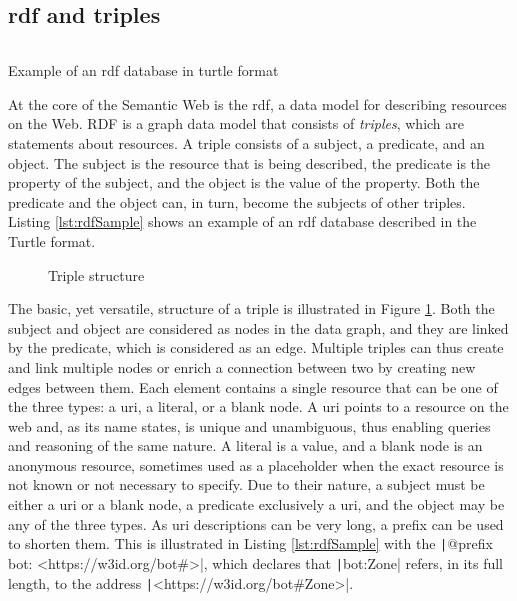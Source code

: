 \subsection{\acs{rdf} and triples}

\begin{listing}[h]
	\inputminted{turtle}{figures/snippets/rdfSample.ttl}
	\vspace{-0.7cm}
	\caption{Example of an \ac{rdf} database in turtle format}
	\label{lst:rdfSample}
\end{listing}

At the core of the Semantic Web is the \ac{rdf}, a data model for describing resources on the Web. RDF is a graph data model that consists of \emph{triples}, which are statements about resources. A triple consists of a subject, a predicate, and an object. The subject is the resource that is being described, the predicate is the property of the subject, and the object is the value of the property. Both the predicate and the object can, in turn, become the subjects of other triples. Listing \ref{lst:rdfSample} shows an example of an \ac{rdf} database described in the Turtle format.


\begin{figure}[h]
	\centering
	
	\caption{Triple structure}
	\label{fig:triple}
\end{figure}

The basic, yet versatile, structure of a triple is illustrated in Figure \ref{fig:triple}. Both the subject and object are considered as nodes in the data graph, and they are linked by the predicate, which is considered as an edge. Multiple triples can thus create and link multiple nodes or enrich a connection between two by creating new edges between them. Each element contains a single resource that can be one of the three types: a \acs{uri}, a literal, or a blank node. A \ac{uri} points to a resource on the web and, as its name states, is unique and unambiguous, thus enabling queries and reasoning of the same nature. A literal is a value, and a blank node is an anonymous resource, sometimes used as a placeholder when the exact resource is not known or not necessary to specify. Due to their nature, a subject must be either a \ac{uri} or a blank node, a predicate exclusively a \ac{uri}, and the object may be any of the three types. As \ac{uri} descriptions can be very long, a prefix can be used to shorten them. This is illustrated in Listing \ref{lst:rdfSample} with the \texttt|@prefix bot: <https://w3id.org/bot#>|, which declares that \texttt|bot:Zone| refers, in its full length, to the address \texttt|<https://w3id.org/bot#Zone>|.

